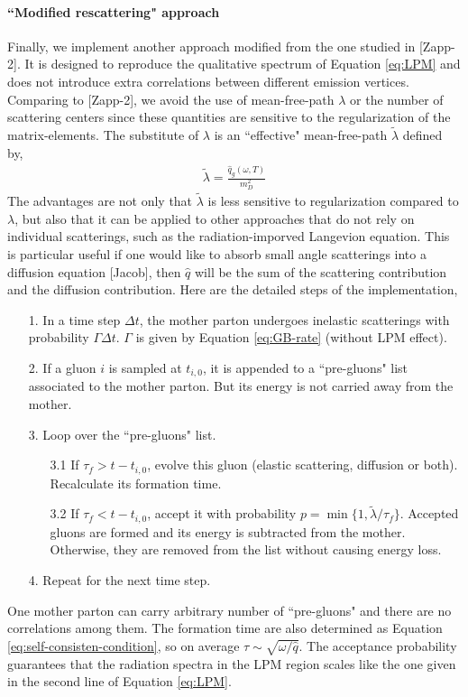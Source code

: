 \documentclass[aps, prc, reprint, amsmath, groupedaddress, nofootinbib]{revtex4-1}
\begin{document}
\paragraph*{``Modified rescattering" approach} Finally, we implement another approach modified from the one studied in [Zapp-2].
It is designed to reproduce the qualitative spectrum of Equation \ref{eq:LPM} and does not introduce extra correlations between different emission vertices. 
Comparing to [Zapp-2], we avoid the use of mean-free-path $\lambda$ or the number of scattering centers since these quantities are sensitive to the regularization of the matrix-elements. 
The substitute of $\lambda$ is an ``effective" mean-free-path $\tilde{\lambda}$ defined by,
\begin{eqnarray}\label{eq:effmpf}
\tilde{\lambda} = \frac{\hat{q}_g(\omega, T)}{m_D^2}
\end{eqnarray}
The advantages are not only that $\tilde{\lambda}$ is less sensitive to regularization compared to $\lambda$, but also that it can be applied to other approaches that do not rely on individual scatterings, such as the radiation-imporved Langevion equation.
This is particular useful if one would like to absorb small angle scatterings into a diffusion equation [Jacob], then $\hat{q}$ will be the sum of the scattering contribution and the diffusion contribution.
Here are the detailed steps of the implementation,
\begin{itemize}
\item[1.] In a time step $\Delta t$, the mother parton undergoes inelastic scatterings with probability $\Gamma\Delta t$. $\Gamma$ is given by Equation \ref{eq:GB-rate} (without LPM effect).
\item[2.] If a gluon $i$ is sampled at $t_{i,0}$, it is appended to a ``pre-gluons" list associated to the mother parton. But its energy is not carried away from the mother.
\item[3.] Loop over the ``pre-gluons" list. 
\begin{itemize}
\item[3.1] If $\tau_f > t-t_{i,0}$, evolve this gluon (elastic scattering, diffusion or both). Recalculate its formation time.
\item[3.2] If $\tau_f < t-t_{i,0}$, accept it with probability $p = \min\{1, \tilde{\lambda}/\tau_f\}$. Accepted gluons are formed and its energy is subtracted from the mother. Otherwise, they are removed from the list without causing energy loss.
\end{itemize} 
\item[4.] Repeat for the next time step.
\end{itemize}
One mother parton can carry arbitrary number of ``pre-gluons" and there are no correlations among them.
The formation time are also determined as Equation \ref{eq:self-consisten-condition}, so on average $\tau \sim \sqrt{\omega/\hat{q}}$.
The acceptance probability guarantees that the radiation spectra in the LPM region scales like the one given in the second line of Equation \ref{eq:LPM}.
\end{document}
